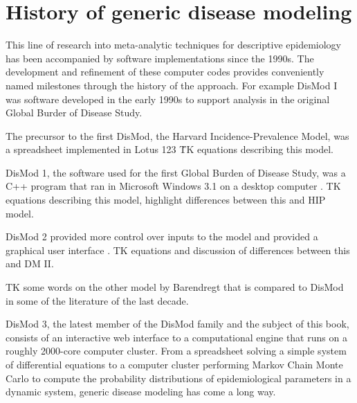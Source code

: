 \section{History of generic disease modeling}

This line of research into meta-analytic techniques for descriptive
epidemiology has been accompanied by software implementations since
the 1990s.  The development and refinement of these computer codes
provides conveniently named milestones through the history of the
approach.  For example DisMod I was software developed in the early
1990s to support analysis in the original Global Burder of Disease
Study.

The precursor to the first DisMod, the Harvard Incidence-Prevalence
Model, was a spreadsheet implemented in Lotus 123
\cite{Murray_Quantifying_1994}\.  TK equations describing this model.

DisMod 1, the software used for the first Global Burden of Disease
Study, was a C++ program that ran in Microsoft Windows 3.1 on a
desktop computer \cite{Harvard_Global_1996}. TK equations describing
this model, highlight differences between this and HIP model.

DisMod 2 provided more control over inputs to the model and provided a
graphical user interface \cite{Barendregt_Generic_2003}. TK equations
and discussion of differences between this and DM II.

TK some words on the other model by Barendregt that is compared to
DisMod in some of the literature of the last decade.

DisMod 3, the latest member of the DisMod family and the subject of
this book, consists of an interactive web interface to a computational
engine that runs on a roughly 2000-core computer cluster. From a
spreadsheet solving a simple system of differential equations to a
computer cluster performing Markov Chain Monte Carlo to compute the
probability distributions of epidemiological parameters in a dynamic
system, generic disease modeling has come a long way.

